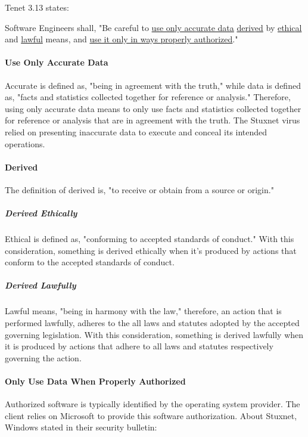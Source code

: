 \documentclass[12pt]{article}
\begin{document}
\begin{multicols}{2}
Tenet 3.13  states:
\begin{framed}
Software Engineers shall, "Be careful to \ul{use only accurate data} \ul{derived} by \ul{ethical} and \ul{lawful} means, and \ul{use it only in ways properly authorized}."\cite{softwareEngineeringCodeOfEthics}
\end{framed}

\paragraph{Use Only Accurate Data}
Accurate is defined as, "being in agreement with the truth," while data is defined as, "facts and statistics collected together for reference or analysis."\cite{cambridgeDictionary} Therefore, using only accurate data means to only use facts and statistics collected together for reference or analysis that are in agreement with the truth. The Stuxnet virus relied on presenting inaccurate data to execute and conceal its intended operations.

\paragraph{Derived}
The definition of derived is, "to receive or obtain from a source or origin."\cite{softwareDefinition}

\subparagraph{Derived Ethically}
Ethical is defined as, "conforming to accepted standards of conduct."\cite{cambridgeDictionary} With this consideration, something is derived ethically when it's produced by actions that conform to the accepted standards of conduct.

\subparagraph{Derived Lawfully}
Lawful means, "being in harmony with the law," therefore, an action that is performed lawfully, adheres to the all laws and statutes adopted by the accepted governing legislation.\cite{cambridgeDictionary} With this consideration, something is derived lawfully when it is produced by actions that adhere to all laws and statutes respectively governing the action.

\paragraph{Only Use Data When Properly Authorized}

Authorized software is typically identified by the operating system provider.  The client relies on Microsoft to provide this software authorization.  About Stuxnet, Windows stated in their security bulletin:


\end{multicols}
\end{document}
